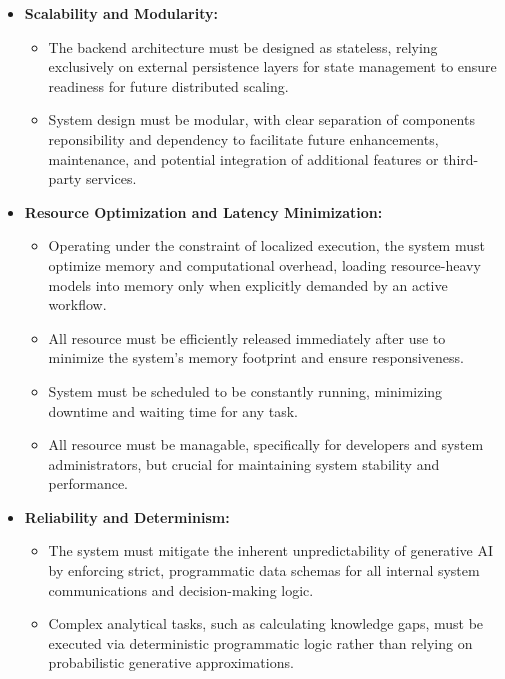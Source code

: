\begin{itemize}
    \item \textbf{Scalability and Modularity:}
    \begin{itemize}
        \item The backend architecture must be designed as stateless, relying exclusively on external persistence layers for state management to ensure readiness 
        for future distributed scaling.
        \item System design must be modular, with clear separation of components reponsibility and dependency to facilitate future enhancements, maintenance, and potential integration of 
        additional features or third-party services.
    \end{itemize}

    \item \textbf{Resource Optimization and Latency Minimization:}
    \begin{itemize}
        \item Operating under the constraint of localized execution, the system must optimize memory and computational overhead, loading resource-heavy 
        models into memory only when explicitly demanded by an active workflow.
        \item All resource must be efficiently released immediately after use to minimize the system's memory footprint and ensure responsiveness.
        \item System must be scheduled to be constantly running, minimizing downtime and waiting time for any task.
        \item All resource must be managable, specifically for developers and system administrators, but crucial for maintaining system stability and performance.
    \end{itemize}

    \item \textbf{Reliability and Determinism:}
    \begin{itemize}
        \item The system must mitigate the inherent unpredictability of generative AI by enforcing strict, programmatic data schemas for all internal system communications and decision-making logic.
        \item Complex analytical tasks, such as calculating knowledge gaps, must be executed via deterministic programmatic logic rather than relying on probabilistic generative approximations.
    \end{itemize}


\end{itemize}
